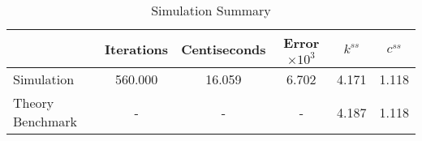 \begin{table}[htb]
\centering
\caption{Simulation Summary}
\label{table:psCp2:tab:sim2a}
\begin{tabular}{lccccc}
\hline
 & Iterations & Centiseconds & Error$\times 10^3$ & $k^{ss}$ & $c^{ss}$ \\
\hline\hline
Simulation & 560.000 & 16.059 & 6.702 & 4.171 & 1.118 \\
Theory Benchmark & - & - & - & 4.187 & 1.118 \\
\hline
\end{tabular}
\end{table}
